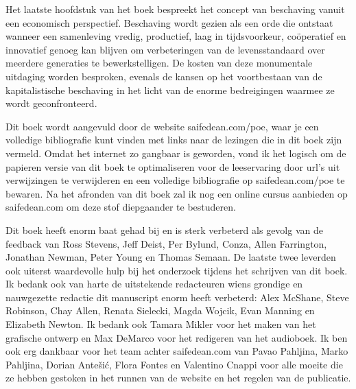 Het laatste hoofdstuk van het boek bespreekt het concept van beschaving vanuit een economisch perspectief. Beschaving wordt gezien als een orde die ontstaat wanneer een samenleving vredig, productief, laag in tijdsvoorkeur, coöperatief en innovatief genoeg kan blijven om verbeteringen van de levensstandaard over meerdere generaties te bewerkstelligen. De kosten van deze monumentale uitdaging worden besproken, evenals de kansen op het voortbestaan van de kapitalistische beschaving in het licht van de enorme bedreigingen waarmee ze wordt geconfronteerd.

Dit boek wordt aangevuld door de website saifedean.com/poe, waar je een volledige bibliografie kunt vinden met links naar de lezingen die in dit boek zijn vermeld. Omdat het internet zo gangbaar is geworden, vond ik het logisch om de papieren versie van dit boek te optimaliseren voor de leeservaring door url's uit verwijzingen te verwijderen en een volledige bibliografie op saifedean.com/poe te bewaren. Na het afronden van dit boek zal ik nog een online cursus aanbieden op saifedean.com om deze stof diepgaander te bestuderen.

Dit boek heeft enorm baat gehad bij en is sterk verbeterd als gevolg van de feedback van Ross Stevens, Jeff Deist, Per Bylund, Conza, Allen Farrington, Jonathan Newman, Peter Young en Thomas Semaan. De laatste twee leverden ook uiterst waardevolle hulp bij het onderzoek tijdens het schrijven van dit boek. Ik bedank ook van harte de uitstekende redacteuren wiens grondige en nauwgezette redactie dit manuscript enorm heeft verbeterd: Alex McShane, Steve Robinson, Chay Allen, Renata Sielecki, Magda Wojcik, Evan Manning en Elizabeth Newton. Ik bedank ook Tamara Mikler voor het maken van het grafische ontwerp en Max DeMarco voor het redigeren van het audioboek. Ik ben ook erg dankbaar voor het team achter saifedean.com van Pavao Pahljina, Marko Pahljina, Dorian Antešić, Flora Fontes en Valentino Cnappi voor alle moeite die ze hebben gestoken in het runnen van de website en het regelen van de publicatie.

